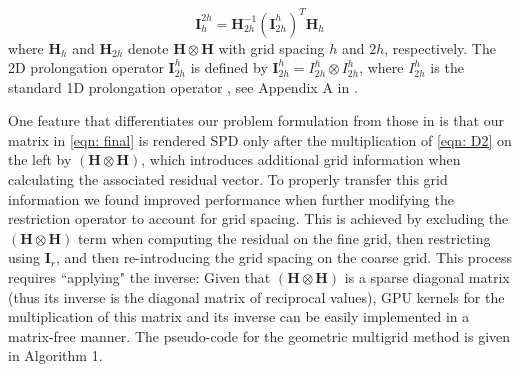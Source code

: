 \begin{equation}
    \boldsymbol{I}_{h}^{2h} = \boldsymbol{H}_{2h}^{-1} \left(\boldsymbol{I}_{2h}^h\right)^T\boldsymbol{H}_h
\end{equation}
%
where $\boldsymbol{H}_{h}$ and $\boldsymbol{H}_{2h}$ denote $\boldsymbol{H} \otimes \boldsymbol{H}$ with grid spacing $h$ and $2h$, respectively. The 2D prolongation operator $\boldsymbol{I}_{2h}^h$ is defined by $\boldsymbol{I}_{2h}^h = I_{2h}^h \otimes I_{2h}^h$, where $I_{2h}^h$ is the standard 1D prolongation operator \citep{Briggs2000}, see Appendix A in \citep{Ruggiu2018}.

One feature that differentiates our problem formulation from those in \citet{Ruggiu2018} is that our matrix in \eqref{eqn: final} is rendered SPD only after the multiplication of \eqref{eqn: D2} on the left by $\left(\boldsymbol{H} \otimes \boldsymbol{H} \right)$, which introduces additional grid information when calculating the associated residual vector. To properly transfer this grid information we found improved performance when further modifying the restriction operator to account for grid spacing. This is achieved by excluding the $\left(\boldsymbol{H} \otimes \boldsymbol{H} \right)$ term when computing the residual on the fine grid, then restricting using $\boldsymbol{I}_r$, and then re-introducing the grid spacing on the coarse grid. This process requires ``applying" the inverse: Given that $\left(\boldsymbol{H} \otimes \boldsymbol{H} \right)$ is a sparse diagonal matrix (thus its inverse is the diagonal matrix of reciprocal values), GPU kernels for the multiplication of this matrix and its inverse can be easily implemented in a matrix-free manner. The pseudo-code for the geometric multigrid method is given in Algorithm 1.





